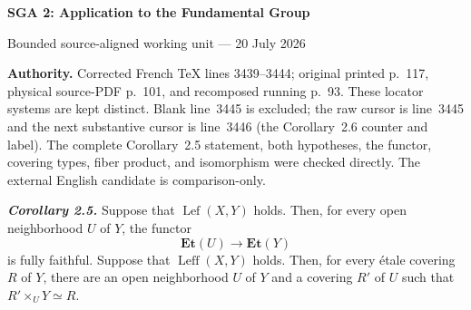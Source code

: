 \documentclass[10pt,a4paper]{article}
\newcommand{\Lefc}{\operatorname{Lef}}
\newcommand{\Leffc}{\operatorname{Leff}}
\newcommand{\Etc}{\mathbf{Et}}
\begin{document}
\begin{center}
  {\Large\bfseries SGA 2: Application to the Fundamental Group}\par\smallskip
  {\large Bounded source-aligned working unit --- 20 July 2026}
\end{center}
\noindent\colorbox{softgray}{\parbox{0.95\linewidth}{\footnotesize\textbf{Authority.}
Corrected French TeX lines 3439--3444; original printed p.~117, physical
source-PDF p.~101, and recomposed running p.~93. These locator systems are
kept distinct. Blank line~3445 is excluded; the raw cursor is line~3445 and
the next substantive cursor is line~3446 (the Corollary~2.6 counter and
label). The complete Corollary~2.5 statement, both hypotheses, the functor,
covering types, fiber product, and isomorphism were checked directly. The
external English candidate is comparison-only.}}

\medskip
\noindent\textbf{\textit{Corollary 2.5.}}
Suppose that $\Lefc(X,Y)$ holds. Then, for every open neighborhood $U$ of
$Y$, the functor
\[
  \Etc(U)\longrightarrow\Etc(Y)
\]
is fully faithful. Suppose that $\Leffc(X,Y)$ holds. Then, for every
\'{e}tale covering $R$ of $Y$, there are an open neighborhood $U$ of $Y$
and a covering $R'$ of $U$ such that
$R'\times_U Y\simeq R$.
\end{document}
